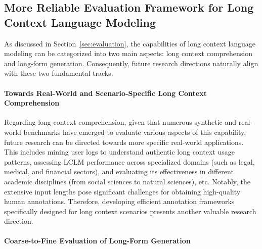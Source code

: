 \documentclass[11pt, a4paper, logo, copyright, nonumbering]{map}
\begin{document}
\subsection{More Reliable Evaluation Framework for Long Context Language Modeling}
As discussed in Section~\ref{sec:evaluation}, the capabilities of long context language modeling can be categorized into two main aspects: long context comprehension and long-form generation. Consequently, future research directions naturally align with these two fundamental tracks.

\paragraph{Towards Real-World and Scenario-Specific Long Context Comprehension}
Regarding long context comprehension, given that numerous synthetic and real-world benchmarks have emerged to evaluate various aspects of this capability, future research can be directed towards more specific real-world applications. This includes mining user logs to understand authentic long context usage patterns, assessing LCLM performance across specialized domains (such as legal, medical, and financial sectors), and evaluating its effectiveness in different academic disciplines (from social sciences to natural sciences), etc. Notably, the extensive input lengths pose significant challenges for obtaining high-quality human annotations. Therefore, developing efficient annotation frameworks specifically designed for long context scenarios presents another valuable research direction.

\paragraph{Coarse-to-Fine Evaluation of Long-Form Generation} 
\end{document}

